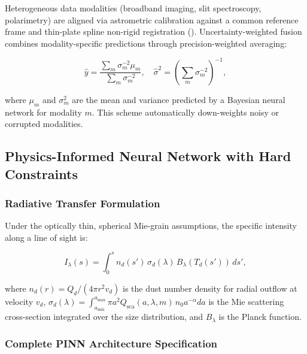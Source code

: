 \documentclass[preprint2]{aastex631}
\begin{document}
Heterogeneous data modalities (broadband imaging, slit spectroscopy, polarimetry) are aligned via astrometric calibration against a common reference frame and thin-plate spline non-rigid registration (\citealt{bertin06}). Uncertainty-weighted fusion combines modality-specific predictions through precision-weighted averaging:

\begin{equation}\label{eq:uncertainty_fusion}
\hat{y} = \frac{\sum_m \sigma_m^{-2} \mu_m}{\sum_m \sigma_m^{-2}}, \quad \hat{\sigma}^2 = \left(\sum_m \sigma_m^{-2}\right)^{-1},
\end{equation}

where $\mu_m$ and $\sigma_m^2$ are the mean and variance predicted by a Bayesian neural network for modality $m$. This scheme automatically down-weights noisy or corrupted modalities.

\subsection{Physics-Informed Neural Network with Hard Constraints}\label{sec:pinn}

\subsubsection{Radiative Transfer Formulation}

Under the optically thin, spherical Mie-grain assumptions, the specific intensity along a line of sight is:

\begin{equation}\label{eq:thin_dust}
I_\lambda(s) = \int_{0}^{s} n_d(s') \, \sigma_d(\lambda) \, B_\lambda(T_d(s')) \, ds',
\end{equation}

where $n_d(r) = Q_d / (4\pi r^2 v_d)$ is the dust number density for radial outflow at velocity $v_d$, $\sigma_d(\lambda) = \int_{a_{\min}}^{a_{\max}} \pi a^2 Q_{\text{sca}}(a,\lambda,m) \, n_0 a^{-\alpha} da$ is the Mie scattering cross-section integrated over the size distribution, and $B_\lambda$ is the Planck function.

\subsubsection{Complete PINN Architecture Specification}\label{sec:arch}
\end{document}
